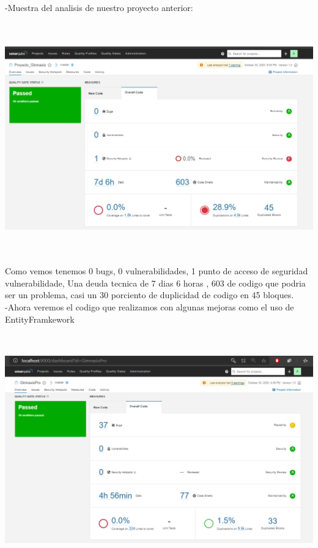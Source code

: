\documentclass[12pt,letterpaper]{article}
\begin{document}
\newpage
-Muestra del analisis de nuestro proyecto anterior:
\begin{center}
    \includegraphics[width=18cm, height=10cm]{img/pro1.png}  
\end{center}
Como vemos tenemos 0 bugs, 0 vulnerabilidades, 1 punto de acceso de seguridad vulnerabilidade,
Una deuda tecnica de  7 dias 6 horas , 603 de codigo que podria ser un problema, casi un 30 porciento de 
duplicidad de codigo en 45 bloques.
\\

\newpage
-Ahora veremos el codigo que realizamos con algunas mejoras como el uso de EntityFramkework

\begin{center}
    \includegraphics[width=18cm, height=10cm]{img/2scan.png}  
\end{center}
\end{document}
